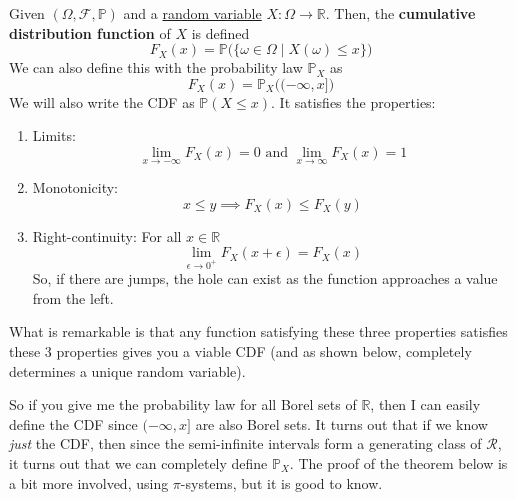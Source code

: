   \begin{definition}
    \label{def:cumulative-distribution-function}
    Given $(\Omega, \mathcal{F}, \mathbb{P})$ and a \hyperref[def:random-variable]{random variable} $X: \Omega \rightarrow \mathbb{R}$. Then, the \textbf{cumulative distribution function} of $X$ is defined 
    \begin{equation}
      F_X (x) =\mathbb{P}\big( \{\omega \in \Omega \mid X(\omega) \leq x\} \big)
    \end{equation}
    We can also define this with the probability law $\mathbb{P}_X$ as 
    \begin{equation}
      F_X (x) = \mathbb{P}_X \big( (-\infty, x] \big)
    \end{equation}
    We will also write the CDF as $\mathbb{P}(X \leq x)$. It satisfies the properties: 
    \begin{enumerate}
      \item Limits: 
      \begin{equation}
        \lim_{x \rightarrow -\infty} F_X (x) = 0 \text{ and } \lim_{x \rightarrow \infty} F_X (x) = 1
      \end{equation}
      \item Monotonicity: 
      \begin{equation}
      x \leq y \implies F_X (x) \leq F_X (y)
      \end{equation}
      \item Right-continuity: For all $x \in \mathbb{R}$
      \begin{equation}
        \lim_{\epsilon \rightarrow 0^+} F_X (x + \epsilon) = F_X (x)
      \end{equation}
      So, if there are jumps, the hole can exist as the function approaches a value from the left. 
    \end{enumerate}
    What is remarkable is that any function satisfying these three properties satisfies these 3 properties gives you a viable CDF (and as shown below, completely determines a unique random variable). 
  \end{definition}

  So if you give me the probability law for all Borel sets of $\mathbb{R}$, then I can easily define the CDF since $(-\infty, x]$ are also Borel sets. It turns out that if we know \textit{just} the CDF, then since the semi-infinite intervals form a generating class of $\mathcal{R}$, it turns out that we can completely define $\mathbb{P}_X$. The proof of the theorem below is a bit more involved, using $\pi$-systems, but it is good to know. 

